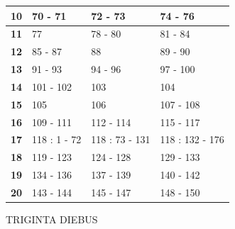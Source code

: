 {{\begin{table}[h]
\begin{tabular}{|cccc|}
  \multicolumn{1}{|c|}{\textbf{10}} & \multicolumn{1}{l|}{70 - 71} & \multicolumn{1}{l|}{72 - 73} & \multicolumn{1}{l|}{74 - 76} \\ \hline
  \multicolumn{1}{|c|}{\textbf{11}} & \multicolumn{1}{l|}{77} & \multicolumn{1}{l|}{78 - 80} & \multicolumn{1}{l|}{81 - 84} \\ \hline
  \multicolumn{1}{|c|}{\textbf{12}} & \multicolumn{1}{l|}{85 - 87} & \multicolumn{1}{l|}{88} & \multicolumn{1}{l|}{89 - 90} \\ \hline
  \multicolumn{1}{|c|}{\textbf{13}} & \multicolumn{1}{l|}{91 - 93} & \multicolumn{1}{l|}{94 - 96} & \multicolumn{1}{l|}{97 - 100} \\ \hline
  \multicolumn{1}{|c|}{\textbf{14}} & \multicolumn{1}{l|}{101 - 102} & \multicolumn{1}{l|}{103} & \multicolumn{1}{l|}{104} \\ \hline
  \multicolumn{1}{|c|}{\textbf{15}} & \multicolumn{1}{l|}{105} & \multicolumn{1}{l|}{106} & \multicolumn{1}{l|}{107 - 108} \\ \hline
  \multicolumn{1}{|c|}{\textbf{16}} & \multicolumn{1}{l|}{109 - 111} & \multicolumn{1}{l|}{112 - 114} & \multicolumn{1}{l|}{115 - 117} \\ \hline
  \multicolumn{1}{|c|}{\textbf{17}} & \multicolumn{1}{l|}{118 : 1 - 72} & \multicolumn{1}{l|}{118 : 73 - 131} & \multicolumn{1}{l|}{118 : 132 - 176} \\ \hline
  \multicolumn{1}{|c|}{\textbf{18}} & \multicolumn{1}{l|}{119 - 123} & \multicolumn{1}{l|}{124 - 128} & \multicolumn{1}{l|}{129 - 133} \\ \hline
  \multicolumn{1}{|c|}{\textbf{19}} & \multicolumn{1}{l|}{134 - 136} & \multicolumn{1}{l|}{137 - 139} & \multicolumn{1}{l|}{140 - 142} \\ \hline
  \multicolumn{1}{|c|}{\textbf{20}} & \multicolumn{1}{l|}{143 - 144} & \multicolumn{1}{l|}{145 - 147} & \multicolumn{1}{l|}{148 - 150} \\ \hline
  \end{tabular}
  \end{table}
}

\vfill\vfill

\newpage

\vspace*{\fill}

{\bfseries\formatTextNoteSection\centering

  TRIGINTA DIEBUS

}

\skipII

{
  \newcommand{\cA}{\bfseries DIES}
  \newcommand{\cB}{\bfseries AD MANE}
  \newcommand{\cC}{\bfseries AD NOCTE}

}}
